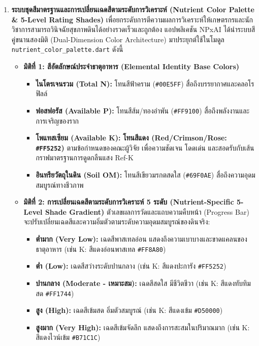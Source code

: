 \documentclass[12pt,a4paper,oneside]{book}
\begin{document}
\begin{enumerate}
    \item \textbf{ระบบชุดสีมาตรฐานและการเปลี่ยนเฉดสีตามระดับการวิเคราะห์ (Nutrient Color Palette \& 5-Level Rating Shades)}
    เพื่อยกระดับการตีความผลการวิเคราะห์ให้เกษตรกรและนักวิชาการสามารถวินิจฉัยสุขภาพดินได้อย่างรวดเร็วและถูกต้อง แอปพลิเคชัน NPxAI ได้นำระบบสีคู่ขนานสองมิติ (Dual-Dimension Color Architecture) มาประยุกต์ใช้ในโมดูล \texttt{nutrient\_color\_palette.dart} ดังนี้
    \begin{itemize}
        \item \textbf{มิติที่ 1: สีอัตลักษณ์ประจำธาตุอาหาร (Elemental Identity Base Colors)}
        \begin{itemize}
            \item \textbf{ไนโตรเจนรวม (Total N):} โทนสีฟ้าคราม (\texttt{\#00E5FF}) สื่อถึงบรรยากาศและคลอโรฟิลล์
            \item \textbf{ฟอสฟอรัส (Available P):} โทนสีส้ม/ทองอำพัน (\texttt{\#FF9100}) สื่อถึงพลังงานและการเจริญของราก
            \item \textbf{โพแทสเซียม (Available K):} \textbf{โทนสีแดง (Red/Crimson/Rose: \texttt{\#FF5252})} ตามข้อกำหนดของคณะผู้วิจัย เพื่อความชัดเจน โดดเด่น และสอดรับกับเส้นกราฟมาตรฐานการดูดกลืนแสง Ref-K
            \item \textbf{อินทรียวัตถุในดิน (Soil OM):} โทนสีเขียวมรกตสดใส (\texttt{\#69F0AE}) สื่อถึงความอุดมสมบูรณ์ทางชีวภาพ
        \end{itemize}
        \item \textbf{มิติที่ 2: การเปลี่ยนเฉดสีตามระดับการวิเคราะห์ 5 ระดับ (Nutrient-Specific 5-Level Shade Gradient)}
        ตัวเลขผลการวัดและแถบความคืบหน้า (Progress Bar) จะปรับเปลี่ยนเฉดสีและความอิ่มตัวตามระดับความอุดมสมบูรณ์ของดินจริง:
        \begin{itemize}
            \item \textbf{ต่ำมาก (Very Low):} เฉดสีพาสเทลอ่อน แสดงถึงความเบาบางและขาดแคลนของธาตุอาหาร (เช่น K: สีแดงอ่อนพาสเทล \texttt{\#FF8A80})
            \item \textbf{ต่ำ (Low):} เฉดสีสว่างระดับปานกลาง (เช่น K: สีแดงปะการัง \texttt{\#FF5252})
            \item \textbf{ปานกลาง (Moderate - เหมาะสม):} เฉดสีสดใส มีชีวิตชีวา (เช่น K: สีแดงทับทิมสด \texttt{\#FF1744})
            \item \textbf{สูง (High):} เฉดสีเข้มสด อิ่มตัวสมบูรณ์ (เช่น K: สีแดงเข้ม \texttt{\#D50000})
            \item \textbf{สูงมาก (Very High):} เฉดสีเข้มจัดลึก แสดงถึงการสะสมในปริมาณมาก (เช่น K: สีแดงไวน์เข้ม \texttt{\#B71C1C})

\end{itemize}
\end{itemize}
\end{enumerate}
\end{document}
